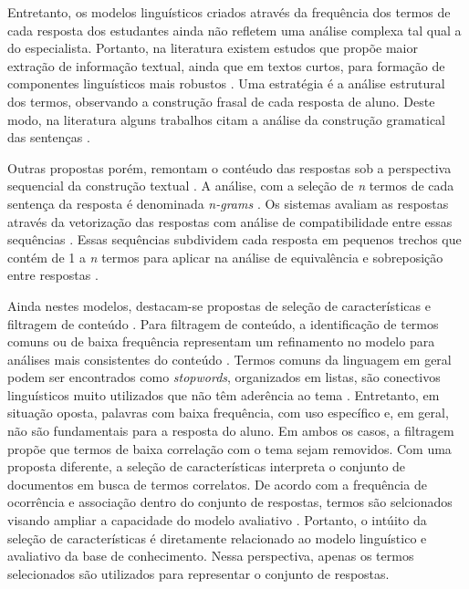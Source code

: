 Entretanto, os modelos linguísticos criados através da frequência dos termos de cada resposta dos estudantes ainda não refletem uma análise complexa tal qual a do especialista. Portanto, na literatura existem estudos que propõe maior extração de informação textual, ainda que em textos curtos, para formação de componentes linguísticos mais robustos \cite{saha2018, zesch2018}. Uma estratégia é a análise estrutural dos termos, observando a construção frasal de cada resposta de aluno. Deste modo, na literatura alguns trabalhos citam a análise da construção gramatical das sentenças \cite{ramachandran2015b, roy2016}.

Outras propostas porém, remontam o contéudo das respostas sob a perspectiva sequencial da construção textual \cite{kumar2017}. A análise, com a seleção de \textit{n} termos de cada sentença da resposta é denominada \textit{n-grams} \cite{manning1999}. Os sistemas avaliam as respostas através da vetorização das respostas com análise de compatibilidade entre essas sequências \cite{sakaguchi2015, sultan2016}. Essas sequências subdividem cada resposta em pequenos trechos que contém de 1 a \textit{n} termos para aplicar na análise de equivalência e sobreposição entre respostas \cite{jimenez2013}. 

Ainda nestes modelos, destacam-se propostas de seleção de características e filtragem de conteúdo \cite{higgins2014, spalenza2016a}. Para filtragem de conteúdo, a identificação de termos comuns ou de baixa frequência representam um refinamento no modelo para análises mais consistentes do conteúdo \cite{zhang2020, marvaniya2018}. Termos comuns da linguagem em geral podem ser encontrados como \textit{stopwords}, organizados em listas, são conectivos linguísticos muito utilizados que não têm aderência ao tema \cite{jurafsky2009}. Entretanto, em situação oposta, palavras com baixa frequência, com uso específico e, em geral, não são fundamentais para a resposta do aluno. Em ambos os casos, a filtragem propõe que termos de baixa correlação com o tema sejam removidos. Com uma proposta diferente, a seleção de características interpreta o conjunto de documentos em busca de termos correlatos. De acordo com a frequência de ocorrência e associação dentro do conjunto de respostas, termos são selcionados visando ampliar a capacidade do modelo avaliativo \cite{krithika2015, spalenza2016b, horbach2018}. Portanto, o intúito da seleção de características é diretamente relacionado ao modelo linguístico e avaliativo da base de conhecimento. Nessa perspectiva, apenas os termos selecionados são utilizados para representar o conjunto de respostas.

